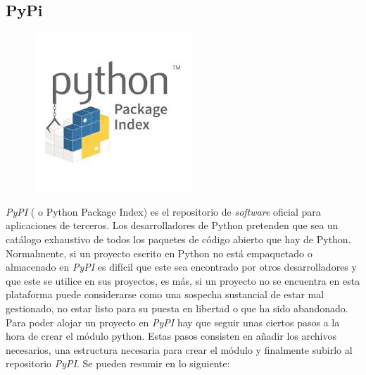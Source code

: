 \subsection{PyPi}
\label{subsec:pypi}
\begin{figure}[h]
    \centering
    \includegraphics[scale=0.5]{img/logo_pypi.jpg}
    \label{fig:logoPypi}
\end{figure}
\emph{PyPI} ( o Python Package Index) es el repositorio de \emph{software} oficial  para aplicaciones de terceros. Los desarrolladores de Python pretenden que sea un catálogo exhaustivo de todos los paquetes de código abierto que hay de Python. Normalmente, si un proyecto escrito en Python no está empaquetado o almacenado en \emph{PyPI}  es difícil que este sea encontrado por otros desarrolladores y que este se utilice en sus proyectos, es más, si un proyecto no se encuentra en esta plataforma puede considerarse como una sospecha sustancial de estar mal gestionado, no estar listo para su puesta en libertad o que ha sido abandonado.  \\
Para poder alojar un proyecto en \emph{PyPI} hay que seguir unas ciertos pasos a la hora de crear  el módulo python. Estas pasos consisten en añadir los archivos necesarios, una estructura necesaria para crear el módulo y finalmente subirlo al repositorio \emph{PyPI}. Se pueden resumir en lo siguiente:
